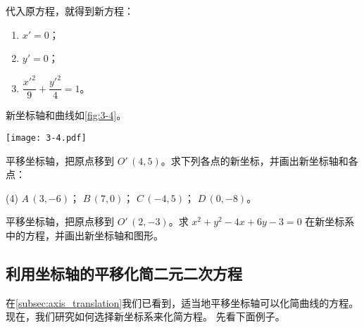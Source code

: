 \noindent
\begin{minipage}{0.6\linewidth}
  代入原方程，就得到新方程：
  \begin{enumerate}
    \item $x'=0$；
    \item $y'=0$；
    \item $\dfrac{x'^2}{9}+\dfrac{y'^2}{4}=1$。
  \end{enumerate}

  \bigskip 新坐标轴和曲线如\cref{fig:3-4}。
\end{minipage}
\begin{minipage}{0.35\linewidth}\centering
\begin{figurehere}
  \texttt{[image: 3-4.pdf]}
  \caption{}\label{fig:3-4}
\end{figurehere}
\end{minipage}

\medskip
\begin{Practice}
  \begin{question}
    \item 平移坐标轴，把原点移到 $O'\,(4,5)$。求下列各点的新坐标，并画出新坐标轴和各点：
    \begin{tasks}(4)
      \task $A\,(3,-6)$；
      \task $B\,(7,0)$；
      \task $C\,(-4,5)$；
      \task $D\,(0,-8)$。
    \end{tasks}
    \item 平移坐标轴，把原点移到 $O'\,(2,-3)$。求 $x^2+y^2-4x+6y-3=0$ 在新坐标系中的方程，并画出新坐标轴和图形。
  \end{question}
\end{Practice}

\subsection{利用坐标轴的平移化简二元二次方程}
在\cref{subsec:axis_translation}我们已看到，适当地平移坐标轴可以化简曲线的方程。现在，我们研究如何选择新坐标系来化简方程。
先看下面例子。

